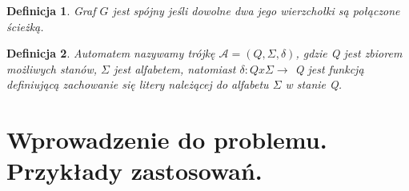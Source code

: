 \documentclass[12pt,a4paper]{article}
\newtheorem{df}{Definicja}[section]
\begin{document}
\begin{df} 
Graf $G$ jest sp\'ojny je\'sli dowolne dwa jego wierzcho{\l}ki s\k{a} po{\l}\k{a}czone \'scie\.zk\k{a}.
\end{df}
\begin{df} 
Automatem nazywamy tr\'{o}jk\k{e} $\mathscr{A}=(Q, \Sigma, \delta)$, gdzie Q jest zbiorem mo\.{z}liwych stan\'{o}w, $\Sigma$ jest alfabetem, natomiast $\delta:Q x \Sigma \rightarrow$ Q jest funkcj\k{a} definiuj\k{a}c\k{a} 	zachowanie si\k{e} litery nale\.{z}\k{a}cej do alfabetu $\Sigma$ w stanie Q.
\end{df}


\newpage
\section{Wprowadzenie do problemu. Przyk{\l}ady zastosowa\'{n}.}
\end{document}
